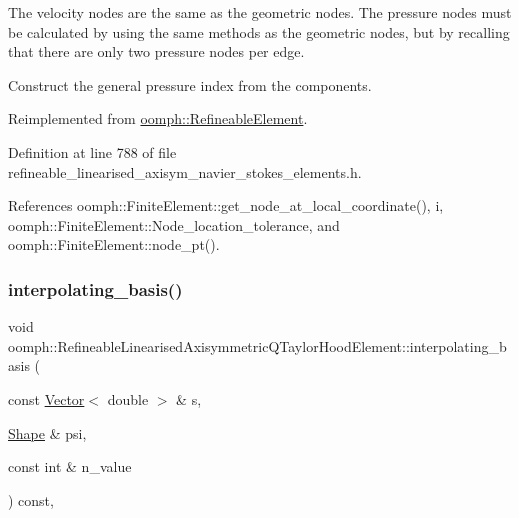 The velocity nodes are the same as the geometric nodes. The pressure nodes must be calculated by using the same methods as the geometric nodes, but by recalling that there are only two pressure nodes per edge. 

Construct the general pressure index from the components. 

Reimplemented from \hyperlink{classoomph_1_1RefineableElement_ad920e66c00888c450f926f08c7793f78}{oomph\+::\+Refineable\+Element}.



Definition at line 788 of file refineable\+\_\+linearised\+\_\+axisym\+\_\+navier\+\_\+stokes\+\_\+elements.\+h.



References oomph\+::\+Finite\+Element\+::get\+\_\+node\+\_\+at\+\_\+local\+\_\+coordinate(), i, oomph\+::\+Finite\+Element\+::\+Node\+\_\+location\+\_\+tolerance, and oomph\+::\+Finite\+Element\+::node\+\_\+pt().

\mbox{\label{classoomph_1_1RefineableLinearisedAxisymmetricQTaylorHoodElement_a45e6a18e861e6c41bb2f7f668b4ec47d}} 
\subsubsection{\texorpdfstring{interpolating\+\_\+basis()}{interpolating\_basis()}}
{\footnotesize\ttfamily void oomph\+::\+Refineable\+Linearised\+Axisymmetric\+Q\+Taylor\+Hood\+Element\+::interpolating\+\_\+basis (\begin{DoxyParamCaption}\item[{const \hyperlink{classoomph_1_1Vector}{Vector}$<$ double $>$ \&}]{s,  }\item[{\hyperlink{classoomph_1_1Shape}{Shape} \&}]{psi,  }\item[{const int \&}]{n\+\_\+value }\end{DoxyParamCaption}) const\hspace{0.3cm}{\ttfamily [inline]}, {\ttfamily [virtual]}}



